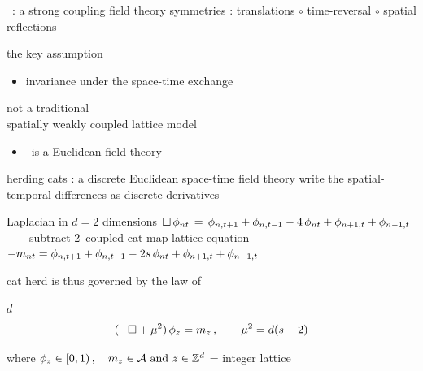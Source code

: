 \begin{frame}{\catlatt\ : a strong coupling field theory}
symmetries : translations $\circ$ time-reversal $\circ$ spatial reflections

\bigskip

\begin{block}{the key assumption}
\begin{itemize}
\item  invariance under the space-time exchange
\end{itemize}
\end{block}
\bigskip

{\color{red}not} a traditional \\
{\color{blue}spatially
weakly coupled} lattice model
\bigskip
%
%
%
\vfill

\begin{itemize}
  \item \catlatt\ is a Euclidean field theory
\end{itemize}
\end{frame} %

\begin{frame}{herding cats : a discrete Euclidean space-time field theory}
write the spatial-temporal differences as discrete derivatives
\begin{block}{Laplacian in %
              $d=2$ dimensions}
\(
\Box\,\phi_{nt} \,=\, \phi_{n,t+1} + \phi_{n,t-1}
- 4 \, \phi_{nt} + \phi_{n+1,t} + \phi_{n-1, t}
\)\\
~~~~{\scriptsize subtract 2\dmn\ coupled cat map lattice equation}\\
\(
-{m_{n t}}
 =
\phi_{n,t+1} + \phi_{n,t-1} - 2s \, \phi_{n t} + \phi_{n+1,t} + \phi_{n-1, t}
\) %
\end{block}

\bigskip

{\color{blue}cat herd} is thus governed by the law of
\begin{block}{$d$\dmn\ \catlatt}
\[
 (-\Box + {\mu}^2)\,\phi_{z} = m_z
\,, \qquad
{\mu}^2= d(s-2)
\] %

\medskip

\end{block}

\bigskip

where
\(
  \phi_{z} \in [0,1)
    \,, \quad
  {\ensuremath{m_{z}}} \in \mathcal{A}
    \mbox{  and  }
  z\in \mathbb{Z}^{d}
\) = integer lattice
\end{frame} %

